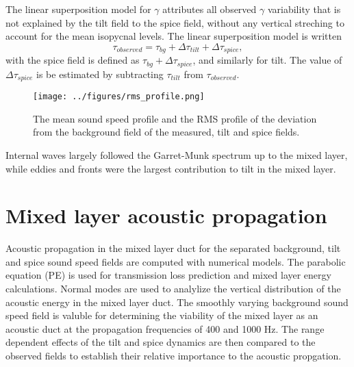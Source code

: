 \documentclass[preprint,NumberedRefs]{JASA}
\begin{document}
The linear superposition model for $\gamma$ attributes all observed $\gamma$ variability that is not explained by the tilt field to the spice field, without any vertical streching to account for the mean isopycnal levels. The linear superposition model is written
\begin{equation}
    \tau_{observed} = \tau_{bg} + \Delta \tau_{tilt} + \Delta \tau_{spice},
\end{equation}
with the spice field is defined as $\tau_{bg} + \Delta \tau_{spice}$, and similarly for tilt. The value of $\Delta \tau_{spice}$ is be estimated by subtracting $\tau_{tilt}$ from $\tau_{observed}$.

\begin{figure}
\texttt{[image: ../figures/rms\_profile.png]}
    \caption{\label{fig:c_rms}{The mean sound speed profile and the RMS profile of the deviation from the background field of the measured, tilt and spice fields. }}
\end{figure}

Internal waves largely followed the Garret-Munk spectrum up to the mixed layer, while eddies and fronts were the largest contribution to tilt in the mixed layer.

\section{\label{sec:propagation}Mixed layer acoustic propagation}
Acoustic propagation in the mixed layer duct for the separated background, tilt and spice sound speed fields are computed with numerical models. The parabolic equation (PE) is used for transmission loss prediction and mixed layer energy calculations. Normal modes are used to analylize the vertical distribution of the acoustic energy in the mixed layer duct. The smoothly varying background sound speed field is valuble for determining the viability of the mixed layer as an acoustic duct at the propagation frequencies of 400 and 1000 Hz. The range dependent effects of the tilt and spice dynamics are then compared to the observed fields to establish their relative importance to the acoustic propgation.
\end{document}
